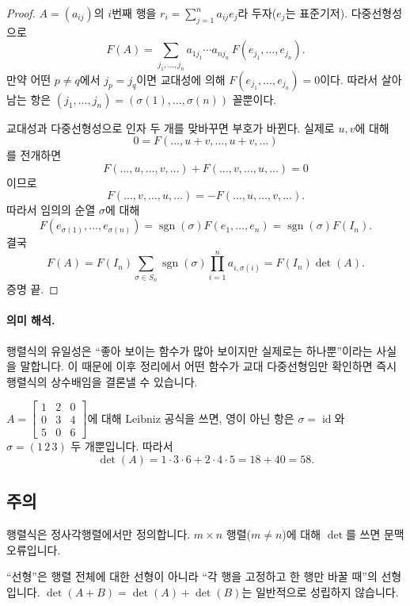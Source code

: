 \begin{proof}
$A=(a_{ij})$의 $i$번째 행을 $r_i=\sum_{j=1}^n a_{ij}e_j$라 두자($e_j$는 표준기저). 다중선형성으로
$$
F(A)=\sum_{j_1,\dots,j_n} a_{1j_1}\cdots a_{nj_n}\,F(e_{j_1},\dots,e_{j_n}).
$$
만약 어떤 $p\ne q$에서 $j_p=j_q$이면 교대성에 의해 $F(e_{j_1},\dots,e_{j_n})=0$이다. 따라서 살아남는 항은 $(j_1,\dots,j_n)=(\sigma(1),\dots,\sigma(n))$ 꼴뿐이다.

교대성과 다중선형성으로 인자 두 개를 맞바꾸면 부호가 바뀐다. 실제로 $u,v$에 대해
$$
0=F(\dots,u+v,\dots,u+v,\dots)
$$
를 전개하면
$$
F(\dots,u,\dots,v,\dots)+F(\dots,v,\dots,u,\dots)=0
$$
이므로
$$
F(\dots,v,\dots,u,\dots)=-F(\dots,u,\dots,v,\dots).
$$
따라서 임의의 순열 $\sigma$에 대해
$$
F(e_{\sigma(1)},\dots,e_{\sigma(n)})=\operatorname{sgn}(\sigma)F(e_1,\dots,e_n)=\operatorname{sgn}(\sigma)F(I_n).
$$
결국
$$
F(A)=F(I_n)\sum_{\sigma\in S_n}\operatorname{sgn}(\sigma)\prod_{i=1}^n a_{i,\sigma(i)}
=F(I_n)\det(A).
$$
증명 끝.
\end{proof}

\paragraph{의미 해석.}
행렬식의 유일성은 ``좋아 보이는 함수가 많아 보이지만 실제로는 하나뿐''이라는 사실을 말합니다. 이 때문에 이후 정리에서 어떤 함수가 교대 다중선형임만 확인하면 즉시 행렬식의 상수배임을 결론낼 수 있습니다.

\begin{example}
$A=\begin{bmatrix}1&2&0\\0&3&4\\5&0&6\end{bmatrix}$에 대해 Leibniz 공식을 쓰면, 영이 아닌 항은 $\sigma=\operatorname{id}$와 $\sigma=(1\,2\,3)$ 두 개뿐입니다. 따라서
$$
\det(A)=1\cdot3\cdot6+2\cdot4\cdot5=18+40=58.
$$
\end{example}

\subsection*{주의}
\begin{warning}
행렬식은 정사각행렬에서만 정의합니다. $m\times n$ 행렬($m\ne n$)에 대해 $\det$를 쓰면 문맥 오류입니다.
\end{warning}
\begin{warning}
``선형''은 행렬 전체에 대한 선형이 아니라 ``각 행을 고정하고 한 행만 바꿀 때''의 선형입니다. $\det(A+B)=\det(A)+\det(B)$는 일반적으로 성립하지 않습니다.
\end{warning}

